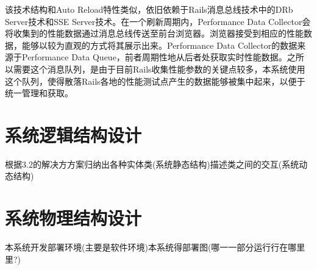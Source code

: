 该技术结构和Auto Reload特性类似，依旧依赖于Rails消息总线技术中的DRb Server技术和SSE Server技术。在一个刷新周期内，Performance Data Collector会将收集到的性能数据通过消息总线传送至前台浏览器。浏览器接受到相应的性能数据，能够以较为直观的方式将其展示出来。Performance Data Collector的数据来源于Performance Data Queue，前者周期性地从后者处获取实时性能数据。之所以需要这个消息队列，是由于目前Rails收集性能参数的关键点较多，本系统使用这个队列，使得散落Rails各地的性能测试点产生的数据能够被集中起来，以便于统一管理和获取。

\section{系统逻辑结构设计}
根据3.2的解决⽅方案归纳出各种实体类(系统静态结构)描述类之间的交互(系统动态结构)

\section{系统物理结构设计}
本系统开发部署环境(主要是软件环境)本系统得部署图(哪⼀一部分运⾏行在哪⾥里?)